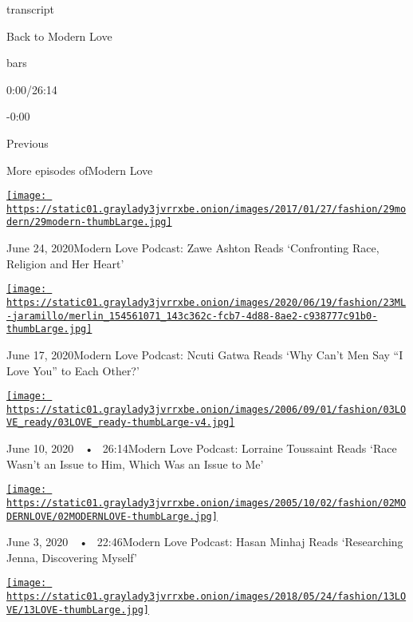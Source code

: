 transcript

Back to Modern Love

bars

0:00/26:14

-0:00

Previous

More episodes ofModern Love

\href{https://www.nytimes3xbfgragh.onion/2020/06/24/style/modern-love-podcast-zawe-ashton.html?action=click\&module=audio-series-bar\&region=header\&pgtype=Article}{\texttt{[image: https://static01.graylady3jvrrxbe.onion/images/2017/01/27/fashion/29modern/29modern-thumbLarge.jpg]}}

June 24, 2020Modern Love Podcast: Zawe Ashton Reads `Confronting Race,
Religion and Her Heart'

\href{https://www.nytimes3xbfgragh.onion/2020/06/17/style/modern-love-podcast-ncuti-gatwa.html?action=click\&module=audio-series-bar\&region=header\&pgtype=Article}{\texttt{[image: https://static01.graylady3jvrrxbe.onion/images/2020/06/19/fashion/23ML-jaramillo/merlin\_154561071\_143c362c-fcb7-4d88-8ae2-c938777c91b0-thumbLarge.jpg]}}

June 17, 2020Modern Love Podcast: Ncuti Gatwa Reads `Why Can't Men Say
``I Love You'' to Each Other?'

\href{https://www.nytimes3xbfgragh.onion/2020/06/10/style/modern-love-podcast-lorraine-toussant-updated-poscript.html?action=click\&module=audio-series-bar\&region=header\&pgtype=Article}{\texttt{[image: https://static01.graylady3jvrrxbe.onion/images/2006/09/01/fashion/03LOVE\_ready/03LOVE\_ready-thumbLarge-v4.jpg]}}

June 10, 2020~~•~ 26:14Modern Love Podcast: Lorraine Toussaint Reads
`Race Wasn't an Issue to Him, Which Was an Issue to Me'

\href{https://www.nytimes3xbfgragh.onion/2020/06/03/style/modern-love-podcast-hasan-minhaj.html?action=click\&module=audio-series-bar\&region=header\&pgtype=Article}{\texttt{[image: https://static01.graylady3jvrrxbe.onion/images/2005/10/02/fashion/02MODERNLOVE/02MODERNLOVE-thumbLarge.jpg]}}

June 3, 2020~~•~ 22:46Modern Love Podcast: Hasan Minhaj Reads
`Researching Jenna, Discovering Myself'

\href{https://www.nytimes3xbfgragh.onion/2020/05/27/style/modern-love-podcast-saoirse-ronan.html?action=click\&module=audio-series-bar\&region=header\&pgtype=Article}{\texttt{[image: https://static01.graylady3jvrrxbe.onion/images/2018/05/24/fashion/13LOVE/13LOVE-thumbLarge.jpg]}}

